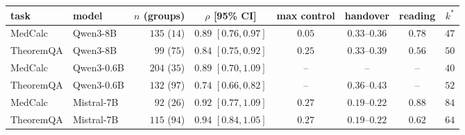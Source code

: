 \begin{tabular}{@{}llrccccc@{}}
\toprule
task & model & $n$ (groups) & $\rho$ [95\% CI] & max control & handover & reading & $k^{*}$ \\
\midrule
MedCalc & Qwen3-8B & $135$ ($14$) & $0.89$ $[0.76,0.97]$ & $0.05$ & $0.33$--$0.36$ & $0.78$ & $47$ \\
TheoremQA & Qwen3-8B & $99$ ($75$) & $0.84$ $[0.75,0.92]$ & $0.25$ & $0.33$--$0.39$ & $0.56$ & $50$ \\
MedCalc & Qwen3-0.6B & $204$ ($35$) & $0.89$ $[0.70,1.09]$ & -- & -- & -- & $40$ \\
TheoremQA & Qwen3-0.6B & $132$ ($97$) & $0.74$ $[0.66,0.82]$ & -- & $0.36$--$0.43$ & -- & $52$ \\
MedCalc & Mistral-7B & $92$ ($26$) & $0.92$ $[0.77,1.09]$ & $0.27$ & $0.19$--$0.22$ & $0.88$ & $84$ \\
TheoremQA & Mistral-7B & $115$ ($94$) & $0.94$ $[0.84,1.05]$ & $0.27$ & $0.19$--$0.22$ & $0.62$ & $64$ \\
\bottomrule
\end{tabular}
